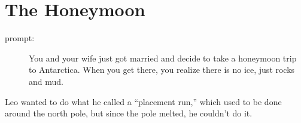 \section*{The Honeymoon}

\begin{description}
\item[prompt:] You and your wife just got married and decide to take a honeymoon trip to Antarctica. When you get there, you realize there is no ice, just rocks and mud.
\end{description}

Leo wanted to do what he called a ``placement run,'' which used to be done around the north pole, but since the pole melted, he couldn't do it.
